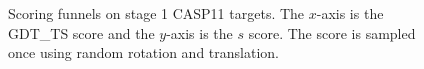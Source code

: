 \documentclass[letter,10pt]{article}
\begin{document}
\begin{figure}[H]
    \vspace{-2em}
    \centering
    \caption{Scoring funnels on stage 1 CASP11 targets. The
      $x$-axis is the GDT\_TS score and the $y$-axis is the $s$
      score. The score is sampled once using random rotation and
      translation.}
    \label{Fig:Satage1CASP11Funnels}
\end{figure}
\end{document}
